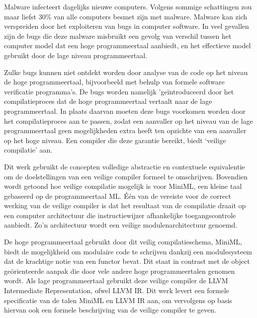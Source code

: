 \documentclass[10pt,a4paper,master=cws, masteroption=ai,english,inputenc=utf8]{kulemt}
\begin{document}
\begin{abstract*}
Malware infecteert dagelijks nieuwe computers.
Volgens sommige schattingen zou maar liefst 30\% van alle computers besmet zijn met malware.
Malware kan zich verspreiden door het exploiteren van bugs in computer software.
In veel gevallen zijn de bugs die deze malware misbruikt een gevolg van verschil tussen het computer model dat een hoge programmeertaal aanbiedt, en het effectieve model gebruikt door de lage niveau programmeertaal.

Zulke bugs kunnen niet ontdekt worden door analyse van de code op het niveau de hoge programmeertaal, bijvoorbeeld met behulp van formele software verificatie programma's. De bugs worden namelijk 'ge\"introduceerd door het compilatieproces dat de hoge programmeertaal vertaalt naar de lage programmeertaal.
In plaats daarvan moeten deze bugs voorkomen worden door het compilatieproces aan te passen, zodat een aanvaller op het niveau van de lage programmeertaal geen mogelijkheden extra heeft ten opzichte van een aanvaller op het hoge niveau.
Een compiler die deze garantie bereikt, biedt `veilige compilatie' aan.

Dit werk gebruikt de concepten volledige abstractie en contextuele equivalentie om de doelstellingen van een veilige compiler formeel te omschrijven. Bovendien wordt getoond hoe veilige compilatie mogelijk is voor MiniML, een kleine taal gebaseerd op de programmeertaal ML.
\'E\'en van de vereiste voor de correct werking van de veilige compiler is dat het resultaat van de compilatie draait op een computer architectuur die instructiewijzer afhankelijke toegangscontrole aanbiedt. Zo'n architectuur wordt een veilige modulenarchitectuur genoemd.

De hoge programmeertaal gebruikt door dit veilig compilatieschema, MiniML, biedt de mogelijkheid om modulaire code te schrijven dankzij een modulesysteem dat de krachtige notie van een functor bevat.
Dit staat in contrast met de object ge\"orienteerde aanpak die door vele andere hoge programmeertalen genomen wordt.
Als lage programmeertaal gebruikt deze veilige compiler de LLVM Intermediate Representation, ofwel LLVM IR.
Dit werk levert een formele specificatie van de talen MiniML en LLVM IR aan, om vervolgens op basis hiervan ook een formele beschrijving van de veilige compiler te geven.  
\end{abstract*}

\mainmatter








\end{document}
